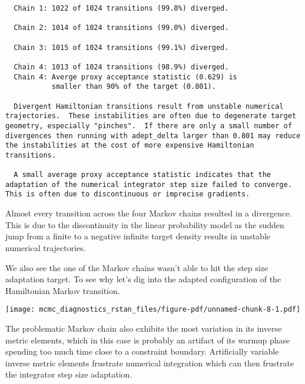 \documentclass[
  letterpaper,
  DIV=11,
  numbers=noendperiod]{scrartcl}
\newenvironment{Shaded}{\begin{snugshade}}{\end{snugshade}}
\newcommand{\DecValTok}[1]{\textcolor[rgb]{0.68,0.00,0.00}{#1}}
\newcommand{\FunctionTok}[1]{\textcolor[rgb]{0.28,0.35,0.67}{#1}}
\newcommand{\NormalTok}[1]{\textcolor[rgb]{0.00,0.23,0.31}{#1}}
\newcommand{\SpecialCharTok}[1]{\textcolor[rgb]{0.37,0.37,0.37}{#1}}
\begin{document}
\begin{verbatim}
  Chain 1: 1022 of 1024 transitions (99.8%) diverged.

  Chain 2: 1014 of 1024 transitions (99.0%) diverged.

  Chain 3: 1015 of 1024 transitions (99.1%) diverged.

  Chain 4: 1013 of 1024 transitions (98.9%) diverged.
  Chain 4: Averge proxy acceptance statistic (0.629) is
           smaller than 90% of the target (0.801).

  Divergent Hamiltonian transitions result from unstable numerical
trajectories.  These instabilities are often due to degenerate target
geometry, especially "pinches".  If there are only a small number of
divergences then running with adept_delta larger than 0.801 may reduce
the instabilities at the cost of more expensive Hamiltonian
transitions.

  A small average proxy acceptance statistic indicates that the
adaptation of the numerical integrator step size failed to converge.
This is often due to discontinuous or imprecise gradients.
\end{verbatim}

Almost every transition across the four Markov chains resulted in a
divergence. This is due to the discontinuity in the linear probability
model as the sudden jump from a finite to a negative infinite target
density results in unstable numerical trajectories.

We also see the one of the Markov chains wasn't able to hit the step
size adaptation target. To see why let's dig into the adapted
configuration of the Hamiltonian Markov transition.

\begin{Shaded}
\end{Shaded}

\texttt{[image: mcmc\_diagnostics\_rstan\_files/figure-pdf/unnamed-chunk-8-1.pdf]}

The problematic Markov chain also exhibits the most variation in its
inverse metric elements, which in this case is probably an artifact of
its warmup phase spending too much time close to a constraint boundary.
Artificially variable inverse metric elements frustrate numerical
integration which can then frustrate the integrator step size
adaptation.
\end{document}
